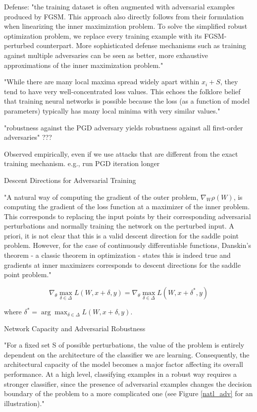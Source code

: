 \documentclass[english]{article}
\begin{document}
\item Defense: "the training dataset is often augmented with adversarial examples produced
by FGSM. This approach also directly follows from their formulation when linearizing the inner maximization
problem. To solve the simplified robust optimization problem, we replace every training example
with its FGSM-perturbed counterpart. More sophisticated defense mechanisms such as training
against multiple adversaries can be seen as better, more exhaustive approximations of the inner
maximization problem."

\item "While there are many local maxima spread widely apart within
$x_i + S$, they tend to have very well-concentrated loss values. This echoes the folklore belief that
training neural networks is possible because the loss (as a function of model parameters) typically
has many local minima with very similar values."

\item "robustness against the PGD adversary yields
robustness against all first-order adversaries" ???

Observed empirically, even if we use attacks that are different from the exact training mechanism. e.g., run PGD iteration longer 

\item Descent Directions for Adversarial Training

"A natural way of computing the gradient of the outer problem,
$\nabla_W \rho(W)$, is computing the gradient of the loss function at a maximizer of the inner problem. This
corresponds to replacing the input points by their corresponding adversarial perturbations and
normally training the network on the perturbed input. A priori, it is not clear that this is a valid
descent direction for the saddle point problem. However, for the case of continuously differentiable
functions, Danskin's theorem - a classic theorem in optimization - states this is indeed true and
gradients at inner maximizers corresponds to descent directions for the saddle point problem."


$$\nabla_\theta \max_{\delta\in \Delta}
L(W,x+\delta,y)
= 
\nabla_\theta \max_{\delta\in \Delta}
L(W,x+\delta^*,y)
$$

where $\delta^* = \arg\max_{\delta\in \Delta}
L(W,x+\delta,y)$.

\item Network Capacity and Adversarial Robustness

"For a fixed set S of possible perturbations, the value of the problem is entirely dependent on the
architecture of the classifier we are learning. Consequently, the architectural capacity of the model
becomes a major factor affecting its overall performance. At a high level, classifying examples in
a robust way requires a stronger classifier, since the presence of adversarial examples changes the
decision boundary of the problem to a more complicated one (see Figure \ref{natl_adv} for an illustration)."
\end{document}
